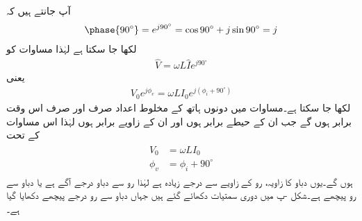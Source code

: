آپ جانتے ہیں کہ
\begin{align}\label{مساوات_بدلتا_عمود}
\phase{90^{\circ}}=e^{j90^{\circ}}=\cos 90^{\circ}+j \sin 90^{\circ}=j
\end{align}
لکھا جا سکتا ہے لہٰذا مساوات  کو 
\begin{align*}
\hat{V}=\omega L \hat{I} e^{j90^{\circ}}
\end{align*} 
یعنی
\begin{align}\label{مساوات_بدلتا_امالہ_تعددی_تعلق_ب}
V_0 e^{j\phi_v}=\omega L I_0 e^{j (\phi_i+90^{\circ})}
\end{align} 
لکھا جا سکتا ہے۔مساوات  میں دونوں ہاتھ کے مخلوط اعداد صرف اور صرف اس وقت برابر ہوں گے جب ان کے حیطے برابر ہوں اور ان کے زاویے برابر ہوں لہٰذا اس مساوات کے تحت
\begin{gather}
\begin{aligned}\label{مساوات_بدلتا_امالہ_رو_پیچھے_ہے}
V_0&=\omega L I_0\\
\phi_v&=\phi_i+90^{\circ}
\end{aligned}
\end{gather}
ہوں گے۔یوں دباو کا زاویہ، رو کے زاویے سے  درجے زیادہ ہے لہٰذا رو سے دباو  درجے آگے ہے یا دباو سے رو  پیچھے ہے۔شکل -پ میں دوری سمتیات دکھائے گئے ہیں جہاں دباو سے رو  درجے پیچھے دکھایا گیا ہے۔

